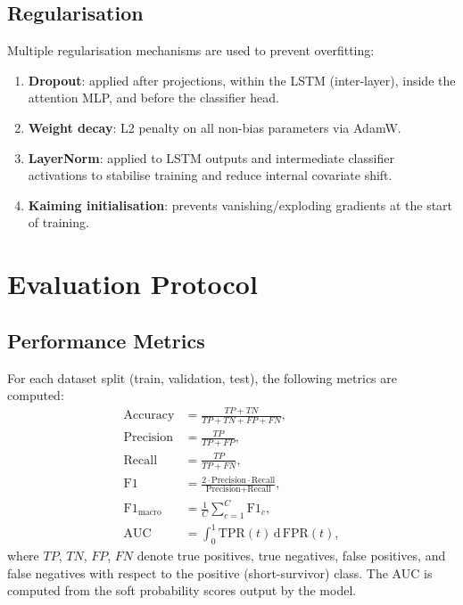 \documentclass[11pt,a4paper]{article}
\begin{document}
\subsection{Regularisation}

Multiple regularisation mechanisms are used to prevent overfitting:
\begin{enumerate}
  \item \textbf{Dropout}: applied after projections, within the LSTM (inter-layer),
        inside the attention MLP, and before the classifier head.
  \item \textbf{Weight decay}: L2 penalty on all non-bias parameters via AdamW.
  \item \textbf{LayerNorm}: applied to LSTM outputs and intermediate classifier
        activations to stabilise training and reduce internal covariate shift.
  \item \textbf{Kaiming initialisation}: prevents vanishing/exploding gradients at
        the start of training.
\end{enumerate}

\section{Evaluation Protocol}
\label{sec:eval}

\subsection{Performance Metrics}

For each dataset split (train, validation, test), the following metrics are computed:
\begin{align}
  \text{Accuracy}  &= \frac{TP + TN}{TP + TN + FP + FN}, \\[4pt]
  \text{Precision} &= \frac{TP}{TP + FP}, \\[4pt]
  \text{Recall}    &= \frac{TP}{TP + FN}, \\[4pt]
  \text{F1}        &= \frac{2 \cdot \text{Precision} \cdot \text{Recall}}{\text{Precision} + \text{Recall}}, \\[4pt]
  \text{F1}_{\text{macro}} &= \frac{1}{C}\sum_{c=1}^{C} \text{F1}_c, \\[4pt]
  \text{AUC}       &= \int_0^1 \text{TPR}(t)\, \mathrm{d}\,\text{FPR}(t),
\end{align}
where $TP$, $TN$, $FP$, $FN$ denote true positives, true negatives, false positives,
and false negatives with respect to the positive (short-survivor) class.
The AUC is computed from the soft probability scores output by the model.
\end{document}
